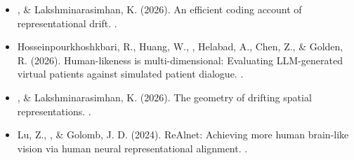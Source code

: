 {  \begin{itemize}
    \item {}, \& Lakshminarasimhan, K. (2026). An efficient coding account of representational drift. . 
    \item Hosseinpourkhoshkbari, R., Huang, W., , Helabad, A., Chen, Z., \& Golden, R. (2026). Human-likeness is multi-dimensional: Evaluating LLM-generated virtual patients against simulated patient dialogue. . 
    \item {}, \& Lakshminarasimhan, K. (2026). The geometry of drifting spatial representations. . 
    \item Lu, Z., , \& Golomb, J. D. (2024). ReAlnet: Achieving more human brain-like vision via human neural representational alignment. . 
  \end{itemize}}

